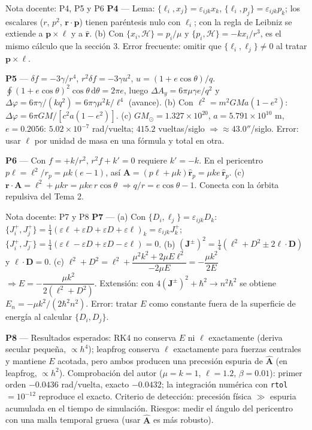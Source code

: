 \documentclass[aspectratio=169]{beamer}
\newcommand{\dd}{\mathrm{d}}
\newcommand{\vr}{\mathbf r}
\newcommand{\vp}{\mathbf p}
\newcommand{\vA}{\mathbf A}
\newcommand{\vD}{\mathbf D}
\newcommand{\vl}{\boldsymbol\ell}
\newcommand{\rh}{\hat{\mathbf r}}
\newcommand{\PB}[2]{\{#1,#2\}}
\newcommand{\Hc}{\mathcal H}
\begin{document}
\begin{frame}{Nota docente: P4, P5 y P6}
\footnotesize
\textbf{P4} — Lema: $\PB{\ell_i}{x_j}=\varepsilon_{ijk}x_k$, $\PB{\ell_i}{p_j}=\varepsilon_{ijk}p_k$; los
escalares ($r$, $p^{2}$, $\vr\cdot\vp$) tienen paréntesis nulo con $\ell_i$; con la regla de Leibniz se
extiende a $\vp\times\vl$ y a $\rh$. (b) Con $\PB{x_i}{\Hc}=p_i/\mu$ y $\PB{p_i}{\Hc}=-kx_i/r^{3}$, es el
mismo cálculo que la sección 3. Error frecuente: omitir que $\PB{\ell_i}{\ell_j}\neq0$ al tratar $\vp\times\vl$.

\textbf{P5} — $\delta f=-3\gamma/r^{4}$, $r^{2}\delta f=-3\gamma u^{2}$, $u=(1+e\cos\theta)/q$.
$\oint(1+e\cos\theta)^{2}\cos\theta\,\dd\theta=2\pi e$, luego $\Delta A_y=6\pi\mu\gamma e/q^{2}$ y
$\Delta\varphi=6\pi\gamma/(kq^{2})=6\pi\gamma\mu^{2}k/\ell^{4}$ (avance). (b) Con
$\ell^{2}=m^{2}GMa(1-e^{2})$: $\Delta\varphi=6\pi GM/[c^{2}a(1-e^{2})]$.
(c) $GM_\odot=1.327\times10^{20}$, $a=5.791\times10^{10}$ m, $e=0.2056$: $5.02\times10^{-7}$ rad/vuelta;
$415.2$ vueltas/siglo $\Rightarrow\approx43.0''$/siglo. \checkmark\;
Error: usar $\ell$ por unidad de masa en una fórmula y total en otra.

\textbf{P6} — Con $f=+k/r^{2}$, $r^{2}f+k'=0$ requiere $k'=-k$. En el pericentro $p\ell=\ell^{2}/r_p=\mu k(e-1)$,
así $\vA=(p\ell+\mu k)\rh_p=\mu k e\,\rh_p$. (c) $\vr\cdot\vA=\ell^{2}+\mu k r=\mu k e\,r\cos\theta$
$\Rightarrow q/r=e\cos\theta-1$. Conecta con la órbita repulsiva del Tema 2.
\end{frame}

\begin{frame}{Nota docente: P7 y P8}
\footnotesize
\textbf{P7} — (a) Con $\PB{D_i}{\ell_j}=\varepsilon_{ijk}D_k$:
$\PB{J^{+}_i}{J^{+}_j}=\tfrac14(\varepsilon\ell+\varepsilon D+\varepsilon D+\varepsilon\ell)_{k}=\varepsilon_{ijk}J^{+}_k$;
$\PB{J^{+}_i}{J^{-}_j}=\tfrac14(\varepsilon\ell-\varepsilon D+\varepsilon D-\varepsilon\ell)=0$.
(b) $(\mathbf J^{\pm})^{2}=\tfrac14(\ell^{2}+D^{2}\pm2\vl\cdot\vD)$ y $\vl\cdot\vD=0$.
(c) $\ell^{2}+D^{2}=\ell^{2}+\dfrac{\mu^{2}k^{2}+2\mu E\ell^{2}}{-2\mu E}=-\dfrac{\mu k^{2}}{2E}$
$\Rightarrow E=-\dfrac{\mu k^{2}}{2(\ell^{2}+D^{2})}$.
Extensión: con $4(\mathbf J^{\pm})^{2}+\hbar^{2}\to n^{2}\hbar^{2}$ se obtiene $E_n=-\mu k^{2}/(2\hbar^{2}n^{2})$.
Error: tratar $E$ como constante fuera de la superficie de energía al calcular $\PB{D_i}{D_j}$.

\textbf{P8} — Resultados esperados: RK4 no conserva $E$ ni $\vl$ exactamente (deriva secular
pequeña, $\propto h^{4}$); leapfrog conserva $\vl$ exactamente para fuerzas centrales y mantiene $E$
acotada, pero ambos producen una precesión espuria de $\hat{\vA}$ (en leapfrog, $\propto h^{2}$).
Comprobación del autor ($\mu=k=1$, $\ell=1.2$, $\beta=0.01$): primer orden $-0.0436$ rad/vuelta,
exacto $-0.0432$; la integración numérica con \texttt{rtol}$=10^{-12}$ reproduce el exacto.
Criterio de detección: precesión física $\gg$ espuria acumulada en el tiempo de simulación.
Riesgos: medir el ángulo del pericentro con una malla temporal gruesa (usar $\hat{\vA}$ es más robusto).
\end{frame}
\fi
\end{document}
